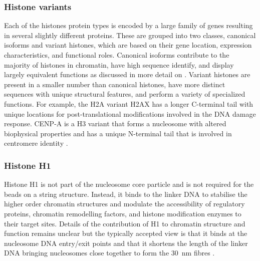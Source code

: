     \subsubsection{Histone variants}

      Each of the histones protein types is encoded by a large family
      of genes resulting in several slightly different proteins.
      These are grouped into two classes, canonical isoforms
      and variant histones, which are based on their gene location,
      expression characteristics, and functional roles.
      Canonical isoforms contribute to the majority
      of histones in chromatin, have high sequence identify, and display
      largely equivalent functions as discussed in more detail on
      .
      Variant histones are present in a smaller number than canonical
      histones, have more distinct sequences with unique structural features,
      and perform a variety of specialized functions.  For example, the
      H2A variant H2AX has a longer C-terminal tail with unique locations
      for post-translational modifications involved in the DNA damage
      response.  CENP-A is a H3 variant that
      forms a nucleosome with altered biophysical properties
      and has a unique N-terminal
      tail that is involved in centromere identity \citep{black2011-cenpa}.

    \subsubsection{Histone H1}

      Histone H1 is not part of the nucleosome core particle and is not
      required for the beads on a string structure.
      Instead, it binds to the linker DNA
      to stabilise the higher order
      chromatin structures and modulate the accessibility of
      regulatory proteins,
      chromatin remodelling factors, and histone modification enzymes
      to their target sites.
      Details
      of the contribution of H1 to chromatin structure and function remains
      unclear but the typically accepted view is that it binds at
      the nucleosome DNA entry/exit points and that it shortens the
      length of the linker DNA bringing nucleosomes close together
      to form the \SI{30}{\nm} fibres \citep{harshman2013h1-review}.

